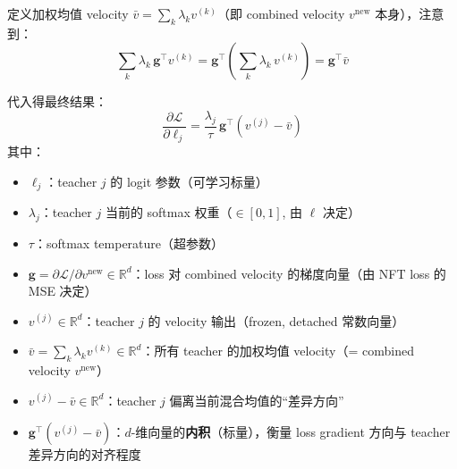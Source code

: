 \documentclass[11pt,a4paper]{article}
\newcommand{\loss}{\mathcal{L}}
\newcommand{\R}{\mathbb{R}}
\theoremstyle{definition}
\begin{document}
定义加权均值 velocity $\bar{v} = \sum_k \lambda_k v^{(k)}$（即 combined velocity $v^{\mathrm{new}}$ 本身），注意到：
\begin{equation}
\sum_k \lambda_k\, \mathbf{g}^\top v^{(k)} = \mathbf{g}^\top \left(\sum_k \lambda_k\, v^{(k)}\right) = \mathbf{g}^\top \bar{v}
\end{equation}

代入得最终结果：
\begin{equation}
\boxed{
\frac{\partial \loss}{\partial \ell_j} = \frac{\lambda_j}{\tau}\,\mathbf{g}^\top\left(v^{(j)} - \bar{v}\right)
}
\label{eq:final_gradient_derivation}
\end{equation}
其中：
\begin{itemize}[leftmargin=1.5em]
\item $\ell_j$：teacher $j$ 的 logit 参数（可学习标量）
\item $\lambda_j$：teacher $j$ 当前的 softmax 权重（$\in [0, 1]$, 由 $\ell$ 决定）
\item $\tau$：softmax temperature（超参数）
\item $\mathbf{g} = \partial\loss / \partial v^{\mathrm{new}} \in \R^d$：loss 对 combined velocity 的梯度向量（由 NFT loss 的 MSE 决定）
\item $v^{(j)} \in \R^d$：teacher $j$ 的 velocity 输出（frozen, detached 常数向量）
\item $\bar{v} = \sum_k \lambda_k v^{(k)} \in \R^d$：所有 teacher 的加权均值 velocity（= combined velocity $v^{\mathrm{new}}$）
\item $v^{(j)} - \bar{v} \in \R^d$：teacher $j$ 偏离当前混合均值的``差异方向''
\item $\mathbf{g}^\top(v^{(j)} - \bar{v})$：$d$-维向量的\textbf{内积}（标量），衡量 loss gradient 方向与 teacher 差异方向的对齐程度
\end{itemize}
\end{document}
